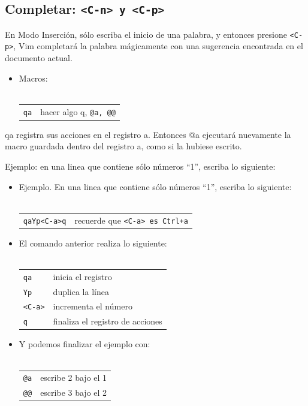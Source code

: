 \documentclass[12pt]{article}
\begin{document}
\subsection{Completar: \texttt{<C-n> y <C-p>}}


En Modo Inserción, sólo escriba el inicio de una palabra,
y entonces presione \texttt{<C-p>}, Vim completará la palabra mágicamente con
una sugerencia encontrada en el documento actual.


\begin{itemize}
	\item Macros: \\ \\ 
\begin{tabular}{ l l }
	\texttt{qa} & hacer algo q, \texttt{@a, @@}
\end{tabular}
\end{itemize}

qa registra sus acciones en el registro a. Entonces @a ejecutará nuevamente
la macro guardada dentro del registro a, como si la hubiese escrito.

Ejemplo: en una linea que contiene sólo números ``1'', escriba lo siguiente:

\begin{itemize}
	\item Ejemplo. En una linea que contiene sólo números ``1'', escriba lo siguiente: \\ \\
\begin{tabular}{ l l }
	\texttt{qaYp<C-a>q} & recuerde que \texttt{<C-a> es Ctrl+a} \\
\end{tabular}
\end{itemize}
\begin{itemize}
	\item El comando anterior realiza lo siguiente: \\ \\
\begin{tabular}{ l l }
            \texttt{qa} & inicia el registro \\
            \texttt{Yp} & duplica la línea \\
            \texttt{<C-a>} & incrementa el número \\
            \texttt{q} & finaliza el registro de acciones \\
\end{tabular}
\end{itemize}
\begin{itemize}
	\item Y podemos finalizar el ejemplo con: \\ \\
\begin{tabular}{ l l }
	\texttt{@a} & escribe 2 bajo el 1 \\
	\texttt{@@} & escribe 3 bajo el 2 \\
\end{tabular}
\end{itemize}
\end{document}
